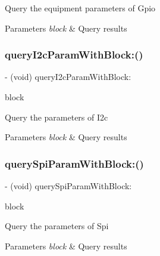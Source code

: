 Query the equipment parameters of Gpio


\begin{DoxyParams}{Parameters}
{\em block} & Query results \\
\hline
\end{DoxyParams}
\mbox{\label{interface_p_v_mount_a3e6a6d1ce16ff6967855933e348624a5}} 
\subsubsection{\texorpdfstring{query\+I2c\+Param\+With\+Block\+:()}{queryI2cParamWithBlock:()}}
{\footnotesize\ttfamily -\/ (void) query\+I2c\+Param\+With\+Block\+: \begin{DoxyParamCaption}\item[{(P\+V\+Query\+I2c\+Param\+Block)}]{block }\end{DoxyParamCaption}}

Query the parameters of I2c


\begin{DoxyParams}{Parameters}
{\em block} & Query results \\
\hline
\end{DoxyParams}
\mbox{\label{interface_p_v_mount_afc15ef1904a8d31435513d8d044ef538}} 
\subsubsection{\texorpdfstring{query\+Spi\+Param\+With\+Block\+:()}{querySpiParamWithBlock:()}}
{\footnotesize\ttfamily -\/ (void) query\+Spi\+Param\+With\+Block\+: \begin{DoxyParamCaption}\item[{(P\+V\+Query\+Spi\+Param\+Block)}]{block }\end{DoxyParamCaption}}

Query the parameters of Spi


\begin{DoxyParams}{Parameters}
{\em block} & Query results \\
\hline
\end{DoxyParams}
\mbox{\label{interface_p_v_mount_ad7007122c7d77395ce7c5761f3de07c4}} 
